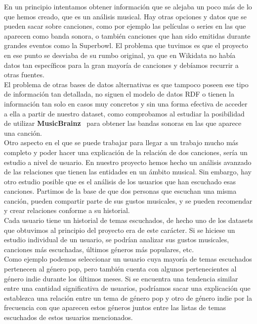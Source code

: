 En un principio intentamos obtener información que se alejaba un poco más de lo que hemos creado, que es un análisis musical. Hay otras opciones y datos que se pueden sacar sobre canciones, como por ejemplo las películas o series en las que aparecen como banda sonora, o también canciones que han sido emitidas durante grandes eventos como la Superbowl. El problema que tuvimos es que el proyecto en ese punto se desviaba de su rumbo original, ya que en Wikidata no había datos tan específicos para la gran mayoría de canciones y debíamos recurrir a otras fuentes.\\

El problema de otras bases de datos alternativas es que tampoco poseen ese tipo de información tan detallada, no siguen el modelo de datos RDF o tienen la información tan solo en casos muy concretos y sin una forma efectiva de acceder a ella a partir de nuestro dataset, como comprobamos al estudiar la posibilidad de utilizar \textbf{MusicBrainz}~\cite{musicbrainz} para obtener las bandas sonoras en las que aparece una canción.\\

Otro aspecto en el que se puede trabajar para llegar a un trabajo mucho más completo y poder hacer una explicación de la relación de dos canciones, sería un estudio a nivel de usuario.
En nuestro proyecto hemos hecho un análisis avanzado de las relaciones que tienen las entidades en un ámbito musical. Sin embargo, hay otro estudio posible que es el análisis de los usuarios que han escuchado esas canciones. Partimos de la base de que dos personas que escuchan una misma canción, pueden compartir parte de sus gustos musicales, y se pueden recomendar y crear relaciones conforme a su historial.\\

Cada usuario tiene un historial de temas escuchados, de hecho uno de los datasets que obtuvimos al principio del proyecto era de este carácter. Si se hiciese un estudio individual de un usuario, se podrían analizar sus gustos musicales, canciones más escuchadas, últimos géneros más populares, etc.\\

Como ejemplo podemos seleccionar un usuario cuya mayoría de temas escuchados pertenecen al género pop, pero también cuenta con algunos pertenecientes al género indie durante los últimos meses. Si se encuentra una tendencia similar entre una cantidad significativa de usuarios, podríamos sacar una explicación que establezca una relación entre un tema de género pop y otro de género indie por la frecuencia con que aparecen estos géneros juntos entre las listas de temas escuchados de estos usuarios mencionados.\\


